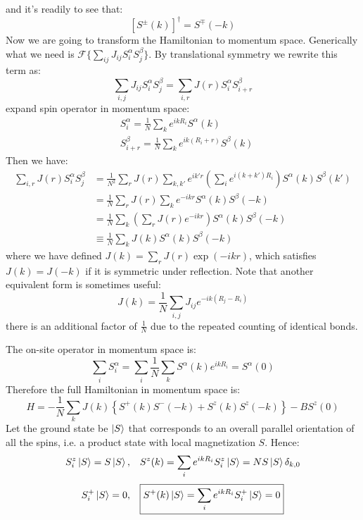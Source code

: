 \documentclass[11pt]{article}
\theoremstyle{remark}
\theoremstyle{definition}
\numberwithin{thm}{section}
\numberwithin{equation}{section}
\begin{document}
and it's readily to see that:
\begin{equation}
	\boxed{\left[ S^\pm(k) \right]^\dagger = S^\mp(-k)}
\end{equation}
Now we are going to transform the Hamiltonian to momentum space. Generically what we need is $\mathcal{F}\{\sum_{ij}J_{ij}S_i^\alpha S_j^\beta \}$. By translational symmetry we rewrite this term as:
\begin{equation}
	\sum_{i, j} J_{ij} S_i^\alpha S_j^\beta = \sum_{i, r} J(r) S_i^\alpha S_{i+r}^\beta
\end{equation}
expand spin operator in momentum space:
\begin{equation}
	\begin{split}
		& S_i^\alpha = \frac{1}{N}\sum_{k} e^{ik R_i}S^\alpha(k)\\
		& S_{i+r}^\beta = \frac{1}{N} \sum_{k} e^{ik(R_i + r)} S^\beta(k) 
	\end{split}
\end{equation}
Then we have:
\begin{equation}
	\begin{split}
		\sum_{i,r} J(r) S_i^\alpha S_j^\beta &= \frac{1}{N^2} \sum_{r}J(r) \sum_{k,k'}e^{ik'r}\left(\sum_{i} e^{i(k+k')R_i} \right)  S^\alpha(k) S^\beta(k') \\
						     &= \frac{1}{N}\sum_{r}J(r) \sum_{k} e^{-ikr} S^\alpha(k) S^\beta(-k) \\
						     &= \frac{1}{N}\sum_{k}\left( \sum_{r}J(r)e^{-ikr}  \right) S^\alpha(k) S^\beta(-k) \\
						     &\equiv \frac{1}{N}\sum_{k} J(k)S^\alpha(k) S^\beta(-k) 
	\end{split}
\end{equation}
where we have defined $J(k) =  \sum_{r} J(r) \exp(-ikr) $, which satisfies $J(k) = J(-k)$ if it is symmetric under reflection. Note that another equivalent form is sometimes useful:
\begin{equation}
	J(k) = \frac{1}{N} \sum_{i,j} J_{ij} e^{-ik( R_j- R_i)} 
\end{equation}
there is an additional factor of $\frac{1}{N}$ due to the repeated counting of identical bonds.

The on-site operator in momentum space is:
\begin{equation}
	\sum_{i} S_i^\alpha = \sum_{i}\frac{1}{N} \sum_{k} S^\alpha(k) e^{ik R_i} = S^\alpha(0)   
\end{equation}
Therefore the full Hamiltonian in momentum space is:
\begin{equation}
	\boxed{H = - \frac{1}{N} \sum_{k} J(k) \left\{S^+(k) S^-(-k) + S^z(k)S^z(-k)\right\} - B S^z(0) }
\end{equation}
Let the ground state be $\ket{S}$ that corresponds to an overall parallel orientation of all the spins, i.e. a product state with local magnetization $S$. Hence:
\begin{equation}
	S_i^z\ket{S} = S\ket{S},\;\;\; S^z(k) = \sum_{i} e^{ikR_i}S_i^z \ket{S} = NS\ket{S}\delta_{k,0}
\end{equation}
\begin{equation}
	S_i^+ \ket{S} = 0,\;\;\; \boxed{S^+(k) \ket{S} = \sum_{i} e^{ikR_i}S_i^+\ket{S} = 0 }
\end{equation}
\end{document}
